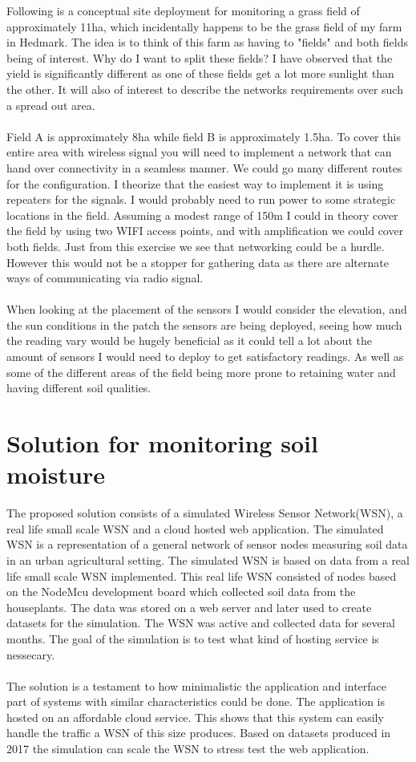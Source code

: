 \documentclass[]{uiophd}
\begin{document}
 Following is a conceptual site deployment for monitoring a grass field of approximately 11ha, which incidentally happens to be the grass field of my farm in Hedmark. The idea is to think of this farm as having to "fields" and both fields being of interest. Why do I want to split these fields? I have observed that the yield is significantly different as one of these fields get a lot more sunlight than the other. It will also of interest to describe the networks requirements over such a spread out area.
 \\\\
 Field A is approximately 8ha while field B is approximately 1.5ha. To cover this entire area with wireless signal you will need to implement a network that can hand over connectivity in a seamless manner. We could go many different routes for the configuration. I theorize that the easiest way to implement it is using repeaters for the signals. I would probably need to run power to some strategic locations in the field. Assuming a modest range of 150m I could in theory cover the field by using two WIFI access points, and with amplification we could cover both fields. Just from this exercise we see that networking could be a hurdle. However this would not be a stopper for gathering data as there are alternate ways of communicating via radio signal.
 \\\\
 When looking at the placement of the sensors I would consider the elevation, and the sun conditions in the patch the sensors are being deployed, seeing how much the reading vary would be hugely beneficial as it could tell a lot about the amount of sensors I would need to deploy to get satisfactory readings. As well as some of the different areas of the field being more prone to retaining water and having different soil qualities. 
 
\chapter{Solution for monitoring soil moisture}
The proposed solution consists of a simulated Wireless Sensor Network(WSN), a real life small scale WSN and a cloud hosted web application. The simulated WSN is a representation of a general network of sensor nodes measuring soil data in an urban agricultural setting. The simulated WSN is based on data from a real life small scale WSN implemented. This real life WSN consisted of nodes based on the NodeMcu development board which collected soil data from the houseplants. The data was stored on a web server and later used to create datasets for the simulation. The WSN was active and collected data for several months. The goal of the simulation is to test what kind of hosting service is nessecary.
\\\\
The solution is a testament to how minimalistic the application and interface part of systems with similar characteristics could be done. The application is hosted on an affordable cloud service. This shows that this system can easily handle the traffic a WSN of this size produces. Based on datasets produced in 2017 the simulation can scale the WSN to stress test the web application.
\end{document}
